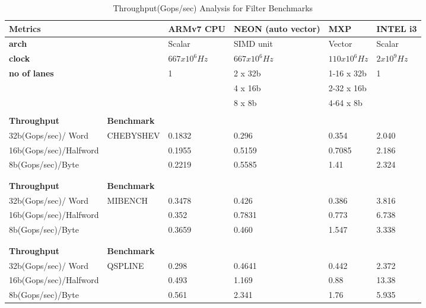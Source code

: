 \begin{table}[htbp]
	\centering
		\begin{adjustbox}{width=1\textwidth}
		\small
	\begin{tabular}{llllll}
		\toprule
		\textbf{Metrics} &   & \textbf{ARMv7 CPU} & \textbf{NEON (auto vector)} & \textbf{MXP} & \textbf{INTEL i3} \\
		\midrule
		\textbf{arch} &   & Scalar & SIMD unit & Vector & Scalar \\
		\textbf{clock} &   & $667 x 10^{6}Hz$ & $667 x 10^{6}Hz$ & $110 x 10^{6}Hz$ & $2 x 10^{9}Hz$ \\
		\textbf{no of lanes} &   & 1 & 2 x 32b & 1-16 x 32b & 1 \\
		&   &   & 4 x 16b & 2-32 x 16b &  \\
		&   &   & 8 x 8b & 4-64 x 8b &  \\
		&   &   &   &   &  \\
		\midrule
		 \textbf{Throughput} & \textbf{Benchmark} &   &   &   &  \\
		\midrule
		 32b(Gops/sec)/ Word   & CHEBYSHEV & 0.1832 & 0.296 & 0.354 & 2.040 \\
	 16b(Gops/sec)/Halfword &   & 0.1955 & 0.5159 & 0.7085 & 2.186 \\
		 8b(Gops/sec)/Byte &   & 0.2219 & 0.5585 & 1.41 & 2.324 \\
		   &   &   &   &   &  \\
		   &   &   &   &   &  \\
		\midrule
		 \textbf{Throughput} & \textbf{Benchmark} &   &   &   &  \\
		\midrule
		 32b(Gops/sec)/ Word   & MIBENCH & 0.3478 & 0.426 & 0.386 & 3.816 \\
		 16b(Gops/sec)/Halfword &   & 0.352 & 0.7831 & 0.773 & 6.738 \\
		 8b(Gops/sec)/Byte &   & 0.3659 & 0.460 & 1.547 & 3.338 \\
		  &   &   &   &   &  \\
		   &   &   &   &   &  \\
		\midrule
	 \textbf{Throughput} & \textbf{Benchmark} &   &   &   &  \\
		\midrule
	 32b(Gops/sec)/ Word   & QSPLINE & 0.298 & 0.4641 & 0.442 & 2.372 \\
	16b(Gops/sec)/Halfword &   & 0.493 & 1.169 & 0.88 & 13.38 \\
		 8b(Gops/sec)/Byte &   & 0.561 & 2.341 & 1.76 & 5.935 \\
		\bottomrule
	\end{tabular}%
    \end{adjustbox}%

		\caption{Throughput(Gops/sec) Analysis for Filter Benchmarks}
		\label{poly:d}%
\end{table}%